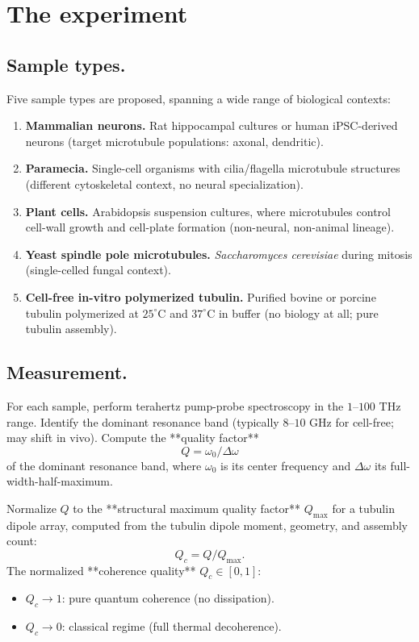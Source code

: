 \documentclass[11pt,reqno]{amsart}
\theoremstyle{plain}
\theoremstyle{definition}
\theoremstyle{remark}
\begin{document}
\section{The experiment}

\subsection{Sample types.}
Five sample types are proposed, spanning a wide range of biological
contexts:

\begin{enumerate}
\item \textbf{Mammalian neurons.} Rat hippocampal cultures or human
iPSC-derived neurons (target microtubule populations: axonal,
dendritic).
\item \textbf{Paramecia.} Single-cell organisms with cilia/flagella
microtubule structures (different cytoskeletal context, no neural
specialization).
\item \textbf{Plant cells.} Arabidopsis suspension cultures, where
microtubules control cell-wall growth and cell-plate formation
(non-neural, non-animal lineage).
\item \textbf{Yeast spindle pole microtubules.} \emph{Saccharomyces
cerevisiae} during mitosis (single-celled fungal context).
\item \textbf{Cell-free in-vitro polymerized tubulin.} Purified bovine
or porcine tubulin polymerized at $25^\circ$C and $37^\circ$C in
buffer (no biology at all; pure tubulin assembly).
\end{enumerate}

\subsection{Measurement.}
For each sample, perform terahertz pump-probe spectroscopy in the
$1$--$100$ THz range. Identify the dominant resonance band (typically
$8$--$10$ GHz for cell-free; may shift in vivo). Compute the
**quality factor**
\[
Q = \omega_0 / \Delta\omega
\]
of the dominant resonance band, where $\omega_0$ is its center frequency
and $\Delta\omega$ its full-width-half-maximum.

Normalize $Q$ to the **structural maximum quality factor** $Q_\text{max}$
for a tubulin dipole array, computed from the tubulin dipole moment,
geometry, and assembly count:
\[
Q_c = Q / Q_\text{max}.
\]
The normalized **coherence quality** $Q_c \in [0, 1]$:
\begin{itemize}
\item $Q_c \to 1$: pure quantum coherence (no dissipation).
\item $Q_c \to 0$: classical regime (full thermal decoherence).
\end{itemize}
\end{document}
